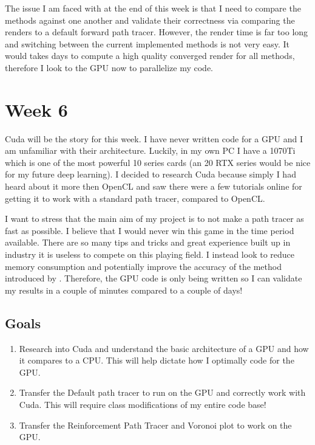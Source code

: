 \documentclass[conference]{IEEEtran}
\begin{document}
The issue I am faced with at the end of this week is that I need to compare the methods against one another and validate their correctness via comparing the renders to a default forward path tracer. However, the render time is far too long and switching between the current implemented methods is not very easy. It would takes days to compute a high quality converged render for all methods, therefore I look to the GPU now to parallelize my code.

\section*{Week 6}
Cuda will be the story for this week. I have never written code for a GPU and I am unfamiliar with their architecture. Luckily, in my own PC I have a 1070Ti which is one of the most powerful 10 series cards (an 20 RTX series would be nice for my future deep learning). I decided to research Cuda because simply I had heard about it more then OpenCL and saw there were a few tutorials online for getting it to work with a standard path tracer, compared to OpenCL.

I want to stress that the main aim of my project is to not make a path tracer as fast as possible. I believe that I would never win this game in the time period available. There are so many tips and tricks and great experience built up in industry it is useless to compete on this playing field. I instead look to reduce memory consumption and potentially improve the accuracy of the method introduced by \cite{dahm2017learning}. Therefore, the GPU code is only being written so I can validate my results in a couple of minutes compared to a couple of days!

\subsection{Goals}
\begin{enumerate}

\item Research into Cuda and understand the basic architecture of a GPU and how it compares to a CPU. This will help dictate how I optimally code for the GPU.

\item Transfer the Default path tracer to run on the GPU and correctly work with Cuda. This will require class modifications of my entire code base!

\item Transfer the Reinforcement Path Tracer and Voronoi plot to work on the GPU.

\end{enumerate}
\end{document}
